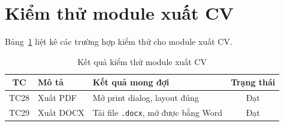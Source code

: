 \documentclass[../DoAn.tex]{subfiles}
\begin{document}
\section{Kiểm thử module xuất CV}

Bảng~\ref{tab:test-export} liệt kê các trường hợp kiểm thử cho module xuất CV.

\begin{table}[H]
\centering
\caption{Kết quả kiểm thử module xuất CV}
\label{tab:test-export}
\begin{tabular}{|c|p{5cm}|p{5cm}|c|}
\hline
\textbf{TC} & \textbf{Mô tả} & \textbf{Kết quả mong đợi} & \textbf{Trạng thái} \\
\hline
TC28 & Xuất PDF & Mở print dialog, layout đúng & Đạt \\
\hline
TC29 & Xuất DOCX & Tải file \texttt{.docx}, mở được bằng Word & Đạt \\
\hline
\end{tabular}
\end{table}
\end{document}
